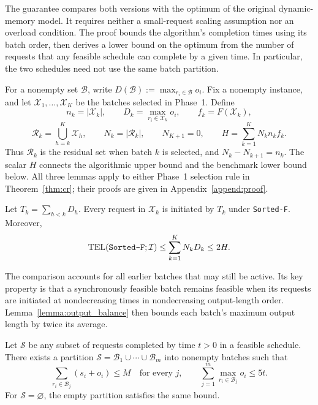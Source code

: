 \documentclass[nonblindrev]{informs3_hide}
\newcommand{\sortF}{\texttt{Sorted-F}}
\begin{document}
The guarantee compares both versions with the optimum of the original
dynamic-memory model. It requires neither a small-request scaling assumption
nor an overload condition. The proof bounds the algorithm's completion
times using its batch order, then derives a lower bound on the optimum from
the number of requests that any feasible schedule can complete by a given
time. In particular, the two schedules need not use the same batch partition.

For a nonempty set $\mathcal B$, write $D(\mathcal B):=\max_{r_i\in\mathcal B}o_i$. Fix a nonempty instance, and let $\mathcal X_1,\ldots,\mathcal X_K$ be the
batches selected in Phase~1. Define
\[
    n_k=|\mathcal X_k|,\qquad
    D_k=\max_{r_i\in\mathcal X_k}o_i,\qquad
    f_k=F(\mathcal X_k),
\]
\[
    \mathcal R_k=\bigcup_{h=k}^K\mathcal X_h,\qquad
    N_k=|\mathcal R_k|,\qquad N_{K+1}=0,
    \qquad H=\sum_{k=1}^K N_kn_kf_k.
\]
Thus $\mathcal R_k$ is the residual set when batch $k$ is selected, and
$N_k-N_{k+1}=n_k$. The scalar $H$ connects the algorithmic upper bound
and the benchmark lower bound below. All three lemmas apply to either
Phase~1 selection rule in Theorem~\ref{thm:cr}; their proofs are given in
Appendix~\ref{append:proof}.

\begin{lemma}
\label{lemma:sf_serial}
Let $T_k=\sum_{h<k}D_h$. Every request in $\mathcal X_k$ is initiated by
$T_k$ under \sortF{}. Moreover,
\begin{equation}
\label{eq:sf_algorithm_bound}
    \mathrm{TEL}(\textup{\sortF};\mathcal I)
    \le\sum_{k=1}^K N_kD_k\le2H.
\end{equation}
\end{lemma}

The comparison accounts for all earlier batches that may still be active.
Its key property is that a synchronously feasible batch remains feasible
when its requests are initiated at nondecreasing times in nondecreasing
output-length order. Lemma~\ref{lemma:output_balance} then bounds each batch's
maximum output length by twice its average.

\begin{lemma}
\label{lemma:sf_deadline}
Let $\mathcal S$ be any subset of requests completed by time $t>0$ in a
feasible schedule. There exists a partition
$\mathcal S=\mathcal B_1\cup\cdots\cup\mathcal B_m$ into nonempty batches such
that
\begin{equation}
\label{eq:sf_deadline_bound}
    \sum_{r_i\in\mathcal B_j}(s_i+o_i)\le M
    \quad\text{for every }j,
    \qquad
    \sum_{j=1}^m\max_{r_i\in\mathcal B_j}o_i\le5t.
\end{equation}
For $\mathcal S=\varnothing$, the empty partition satisfies the same bound.
\end{lemma}
\end{document}
